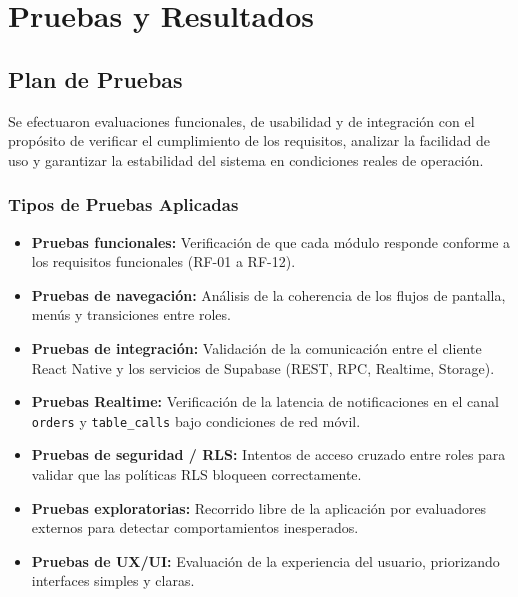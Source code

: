 \chapter{Pruebas y Resultados}

\section{Plan de Pruebas}

Se efectuaron evaluaciones funcionales, de usabilidad y de integración con el
propósito de verificar el cumplimiento de los requisitos, analizar la facilidad de
uso y garantizar la estabilidad del sistema en condiciones reales de operación.

\subsection{Tipos de Pruebas Aplicadas}

\begin{itemize}[leftmargin=1.5em]
  \item \textbf{Pruebas funcionales:} Verificación de que cada módulo responde
        conforme a los requisitos funcionales (RF-01 a RF-12).
  \item \textbf{Pruebas de navegación:} Análisis de la coherencia de los flujos
        de pantalla, menús y transiciones entre roles.
  \item \textbf{Pruebas de integración:} Validación de la comunicación entre
        el cliente React Native y los servicios de Supabase (REST, RPC,
        Realtime, Storage).
  \item \textbf{Pruebas Realtime:} Verificación de la latencia de notificaciones
        en el canal \texttt{orders} y \texttt{table\_calls} bajo condiciones de
        red móvil.
  \item \textbf{Pruebas de seguridad / RLS:} Intentos de acceso cruzado entre
        roles para validar que las políticas RLS bloqueen correctamente.
  \item \textbf{Pruebas exploratorias:} Recorrido libre de la aplicación por
        evaluadores externos para detectar comportamientos inesperados.
  \item \textbf{Pruebas de UX/UI:} Evaluación de la experiencia del usuario,
        priorizando interfaces simples y claras.
\end{itemize}

